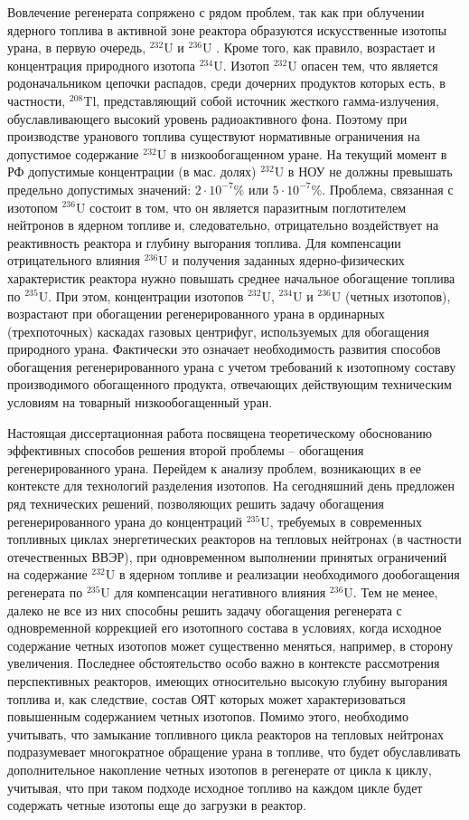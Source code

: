 Вовлечение регенерата сопряжено с рядом проблем, так как при облучении ядерного топлива в активной зоне реактора образуются искусственные изотопы урана, в первую очередь, $^{232}$U и $^{236}$U . Кроме того, как правило, возрастает и концентрация природного изотопа $^{234}$U. Изотоп $^{232}$U опасен тем, что является родоначальником цепочки распадов, среди дочерних продуктов которых есть,  в частности, $^{208}$Tl, представляющий собой источник жесткого гамма-излучения, обуславливающего высокий уровень радиоактивного фона. Поэтому при производстве уранового топлива существуют нормативные ограничения на допустимое содержание $^{232}$U в низкообогащенном уране. На текущий момент в РФ допустимые концентрации (в мас. долях) $^{232}$U в НОУ не должны превышать предельно допустимых значений: $2\cdot10^{-7}$\% или $5\cdot10^{-7}$\%. Проблема, связанная с изотопом $^{236}$U состоит в том, что он является паразитным поглотителем нейтронов в ядерном топливе и, следовательно, отрицательно воздействует на реактивность реактора и глубину выгорания топлива. Для компенсации отрицательного влияния $^{236}$U и получения заданных ядерно-физических характеристик реактора нужно повышать среднее начальное обогащение топлива по $^{235}$U.  При этом, концентрации изотопов $^{232}$U, $^{234}$U и $^{236}$U (четных изотопов), возрастают при обогащении регенерированного урана в ординарных (трехпоточных) каскадах газовых центрифуг, используемых для обогащения природного урана. Фактически это означает необходимость развития способов обогащения регенерированного урана с учетом требований к изотопному составу производимого обогащенного продукта, отвечающих действующим техническим условиям на товарный низкообогащенный уран.

Настоящая диссертационная работа посвящена теоретическому обоснованию эффективных способов решения второй проблемы -- обогащения регенерированного урана.
Перейдем к анализу проблем, возникающих в ее контексте для технологий разделения изотопов. На сегодняшний день предложен ряд технических решений, позволяющих решить задачу обогащения регенерированного урана до концентраций $^{235}$U, требуемых в современных топливных циклах энергетических реакторов на тепловых нейтронах (в частности отечественных ВВЭР), при одновременном выполнении принятых ограничений на содержание $^{232}$U в ядерном топливе и реализации необходимого дообогащения регенерата по $^{235}$U для компенсации негативного влияния $^{236}$U. Тем не менее, далеко не все из них способны решить задачу обогащения регенерата с одновременной коррекцией его изотопного состава в условиях, когда исходное содержание четных изотопов может существенно меняться, например, в сторону увеличения. Последнее обстоятельство особо важно в контексте рассмотрения перспективных реакторов, имеющих относительно высокую глубину выгорания топлива и, как следствие, состав ОЯТ которых может характеризоваться повышенным содержанием четных изотопов. Помимо этого, необходимо учитывать, что замыкание топливного цикла реакторов на тепловых нейтронах подразумевает многократное обращение урана в топливе, что будет обуславливать дополнительное накопление четных изотопов в регенерате от цикла к циклу, учитывая, что при таком подходе исходное топливо на каждом цикле будет содержать четные изотопы еще до загрузки в реактор.

